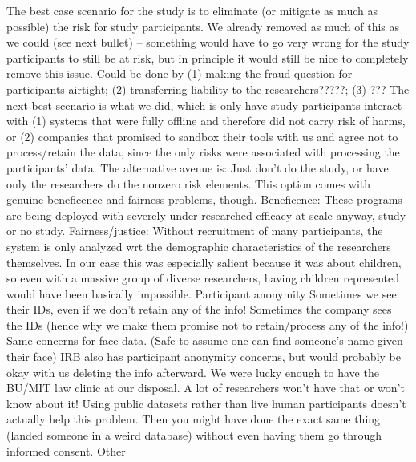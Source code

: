 \3 The best case scenario for the study is to eliminate (or mitigate as much as possible) the risk for study participants.  We already removed as much of this as we could (see next bullet) – something would have to go very wrong for the study participants to still be at risk, but in principle it would still be nice to completely remove this issue.  Could be done by (1) making the fraud question for participants airtight; (2) transferring liability to the researchers?????; (3) ???
\3 The next best scenario is what we did, which is only have study participants interact with (1) systems that were fully offline and therefore did not carry risk of harms, or (2) companies that promised to sandbox their tools with us and agree not to process/retain the data, since the only risks were associated with processing the participants’ data.
\3 The alternative avenue is: Just don’t do the study, or have only the researchers do the nonzero risk elements.  This option comes with genuine beneficence and fairness problems, though.  Beneficence: These programs are being deployed with severely under-researched efficacy at scale anyway, study or no study.  Fairness/justice: Without recruitment of many participants, the system is only analyzed wrt the demographic characteristics of the researchers themselves.  In our case this was especially salient because it was about children, so even with a massive group of diverse researchers, having children represented would have been basically impossible.
\2 Participant anonymity
\3 Sometimes we see their IDs, even if we don’t retain any of the info!
\3 Sometimes the company sees the IDs (hence why we make them promise not to retain/process any of the info!)
\3 Same concerns for face data.  (Safe to assume one can find someone’s name given their face)
\3 IRB also has participant anonymity concerns, but would probably be okay with us deleting the info afterward.
\2 We were lucky enough to have the BU/MIT law clinic at our disposal.  A lot of researchers won’t have that or won’t know about it!
\2 Using public datasets rather than live human participants doesn’t actually help this problem.  Then you might have done the exact same thing (landed someone in a weird database) without even having them go through informed consent.
\2 Other 



